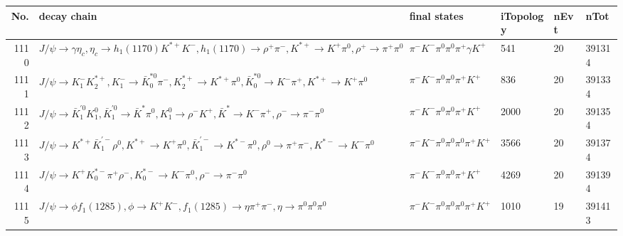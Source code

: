 \begin{table}[htbp] 
\begin{center}
\begin{small}
\begin{tabular}{rlllll}\hline\hline
 No. & decay chain & final states &  iTopology & nEvt & nTot \\\hline
1110&$J/\psi       \rightarrow \gamma       \eta_{c}    , \eta_{c}     \rightarrow h_{1}(1170)    K^{*+}         K^{-}          , h_{1}(1170)     \rightarrow \rho^{+}      \pi^{-}        , K^{*+}          \rightarrow K^{+}          \pi^{0}        , \rho^{+}       \rightarrow \pi^{+}        \pi^{0}        $&$\pi^{-}        K^{-}          \pi^{0}        \pi^{0}        \pi^{+}        \gamma       K^{+}          $&  541&   20&391314\\
1111&$J/\psi       \rightarrow K_{1}^{-}      K_2^{*+}       , K_{1}^{-}       \rightarrow \bar{K}_0^{*0}\pi^{-}        , K_2^{*+}        \rightarrow K^{*+}         \pi^{0}        , \bar{K}_0^{*0} \rightarrow K^{-}          \pi^{+}        , K^{*+}          \rightarrow K^{+}          \pi^{0}        $&$\pi^{-}        K^{-}          \pi^{0}        \pi^{0}        \pi^{+}        K^{+}          $&  836&   20&391334\\
1112&$J/\psi       \rightarrow \bar{K}_1^{'0}K_1^{0}        , \bar{K}_1^{'0} \rightarrow \bar{K}^{*}   \pi^{0}        , K_1^{0}         \rightarrow \rho^{-}      K^{+}          , \bar{K}^{*}    \rightarrow K^{-}          \pi^{+}        , \rho^{-}       \rightarrow \pi^{-}        \pi^{0}        $&$\pi^{-}        K^{-}          \pi^{0}        \pi^{0}        \pi^{+}        K^{+}          $& 2000&   20&391354\\
1113&$J/\psi       \rightarrow K^{*+}         \bar{K}_1^{'-}\rho^{0}      , K^{*+}          \rightarrow K^{+}          \pi^{0}        , \bar{K}_1^{'-} \rightarrow K^{*-}         \pi^{0}        , \rho^{0}       \rightarrow \pi^{+}        \pi^{-}        , K^{*-}          \rightarrow K^{-}          \pi^{0}        $&$\pi^{-}        K^{-}          \pi^{0}        \pi^{0}        \pi^{0}        \pi^{+}        K^{+}          $& 3566&   20&391374\\
1114&$J/\psi       \rightarrow K^{+}          K_{0}^{*-}     \pi^{+}        \rho^{-}      , K_{0}^{*-}      \rightarrow K^{-}          \pi^{0}        , \rho^{-}       \rightarrow \pi^{-}        \pi^{0}        $&$\pi^{-}        K^{-}          \pi^{0}        \pi^{0}        \pi^{+}        K^{+}          $& 4269&   20&391394\\
1115&$J/\psi       \rightarrow \phi           f_{1}(1285)    , \phi            \rightarrow K^{+}          K^{-}          , f_{1}(1285)     \rightarrow \eta          \pi^{+}        \pi^{-}        , \eta           \rightarrow \pi^{0}        \pi^{0}        \pi^{0}        $&$\pi^{-}        K^{-}          \pi^{0}        \pi^{0}        \pi^{0}        \pi^{+}        K^{+}          $& 1010&   19&391413\\

\end{tabular}
\end{small}
\end{center}
\end{table}
